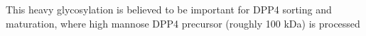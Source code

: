 This heavy glycosylation is believed to be important for DPP4 sorting and maturation, where high mannose DPP4 precursor (roughly 100 kDa) is processed \cite{Matter_1991}